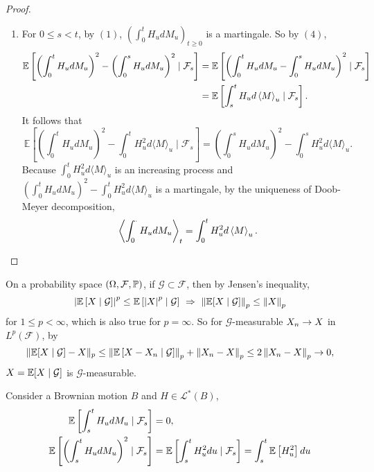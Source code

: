 \begin{proof}
\begin{enumerate}[label=(\arabic{*})]
        \item For $0 \leq s < t$, by $(1)$, $(\int_0^t H_u dM_u)_{t \geq 0}$ is a martingale. So by $(4)$,
        \begin{align*}
            \mathbb{E}\left[\left(\int_0^t H_u dM_u\right)^2 - \left(\int_0^s H_u dM_u\right)^2 \mid \mathcal{F}_s\right] &= \mathbb{E}\left[\left(\int_0^t H_u dM_u - \int_0^s H_u dM_u\right)^2 \mid \mathcal{F}_s\right]\\
            &= \mathbb{E}\left[\int_s^t H_u d\left\langle M \right\rangle_u \mid \mathcal{F}_s\right].
        \end{align*}
        It follows that
        \begin{equation*}
            \mathbb{E}\left[\left(\int_0^t H_u d M_u\right)^2-\int_0^t H_u^2 d\langle M\rangle_u \mid \mathcal{F}_s\right]=\left(\int_0^s H_u d M_u\right)^2-\int_0^s H_u^2 d\langle M\rangle_u.
        \end{equation*}
        Because $\int_0^t H_u^2 d\langle M\rangle_u$ is an increasing process and $\left(\int_0^t H_u d M_u\right)^2-\int_0^t H_u^2 d\langle M\rangle_u$ is a martingale, by the uniqueness of Doob-Meyer decomposition,
        \begin{equation*}
            \left\langle \int_0^\cdot H_u dM_u \right\rangle_t = \int_0^t H_u^2 d \left\langle M \right\rangle_u. \qedhere
        \end{equation*}
    \end{enumerate}
\end{proof}
\begin{rmk}
    On a probability space $(\Omega,\mathcal{F},\mathbb{P})$, if $\mathcal{G} \subset \mathcal{F}$, then by Jensen's inequality,
    \begin{equation*}
        \left\lvert\mathbb{E}\left[X \mid \mathcal{G}\right]\right\lvert^p \leq \mathbb{E}\left[\left\lvert X\right\lvert^p \mid \mathcal{G}\right]~\Rightarrow~\left\lVert\mathbb{E}[X \mid \mathcal{G}]\right\lVert_p \leq \left\lVert X\right\lVert_p
    \end{equation*}
    for $1 \leq p < \infty$, which is also true for $p = \infty$. So for $\mathcal{G}$-measurable $X_n \rightarrow X$ in $L^p(\mathcal{F})$, by
    \begin{equation*}
        \|\mathbb{E}[X \mid \mathcal{G}]-X\|_p \leq\left\|\mathbb{E}\left[X-X_n \mid \mathcal{G}\right]\right\|_p+\left\|X_n-X\right\|_p \leq 2\left\|X_n-X\right\|_p \rightarrow 0,
    \end{equation*}
    $X = \mathbb{E}[X \mid \mathcal{G}]$ is $\mathcal{G}$-measurable. 
\end{rmk}

\begin{cor}
    Consider a Brownian motion $B$ and $H \in \mathcal{L}^*(B)$,
    \begin{align*}
        \mathbb{E}\left[\int_s^t H_u dM_u \mid \mathcal{F}_s\right] &= 0,\\
         \mathbb{E}\left[\left(\int_s^t H_u dM_u\right)^2 \mid \mathcal{F}_s\right] &= \mathbb{E}\left[\int_s^t H^2_u du \mid \mathcal{F}_s\right] =\int_s^t \mathbb{E}\left[ H^2_u\right] du
    \end{align*}
\end{cor}

